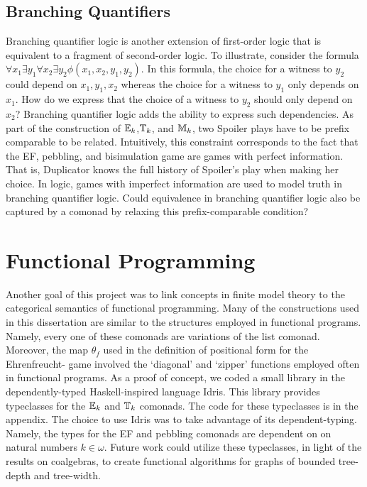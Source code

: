 \subsection{Branching Quantifiers}
 Branching quantifier logic is another extension of first-order logic that is equivalent to a fragment of second-order logic. To illustrate, consider the formula $\forall x_{1} \exists y_{1} \forall x_{2} \exists y_{2} \phi(x_{1},x_{2},y_{1},y_{2})$. In this formula, the choice for a witness to $y_{2}$ could depend on $x_{1},y_{1},x_{2}$ whereas the choice for a witness to $y_{1}$ only depends on $x_{1}$. How do we express that the choice of a witness to $y_{2}$ should only depend on $x_{2}$? Branching quantifier logic adds the ability to express such dependencies. As part of the construction of ${\mathbb{E}_{k}}$,${\mathbb{T}_{k}}$, and ${\mathbb{M}_{k}}$, two Spoiler plays have to be prefix comparable to be related. Intuitively, this constraint corresponds to the fact that the EF, pebbling, and bisimulation game are games with perfect information. That is, Duplicator knows the full history of Spoiler's play when making her choice. In logic, games with imperfect information are used to model truth in branching quantifier logic. Could equivalence in branching quantifier logic also be captured by a comonad by relaxing this prefix-comparable condition?   
\section{Functional Programming}
Another goal of this project was to link concepts in finite model theory to the categorical semantics of functional programming. Many of the constructions used in this dissertation are similar to the structures employed in functional programs. Namely, every one of these comonads are variations of the list comonad. Moreover, the map $\theta_{f}$ used in the definition of positional form for the Ehrenfreucht-{\Fraisse} game involved the `diagonal' and `zipper' functions employed often in functional programs. As a proof of concept, we coded a small library in the dependently-typed Haskell-inspired language Idris. This library provides typeclasses for the ${\mathbb{E}_{k}}$ and ${\mathbb{T}_{k}}$ comonads. The code for these typeclasses is in the appendix. The choice to use Idris was to take advantage of its dependent-typing. Namely, the types for the EF and pebbling comonads are dependent on on natural numbers $k \in \omega$. Future work could utilize these typeclasses, in light of the results on coalgebras, to create functional algorithms for graphs of bounded tree-depth and tree-width.
